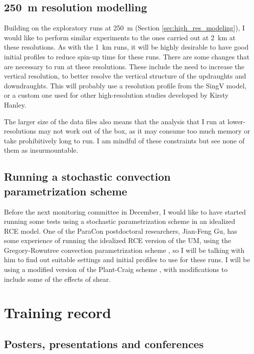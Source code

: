 \documentclass[11pt,a4paper]{article}
\begin{document}
\subsection{\SI{250}{m} resolution modelling}
\label{sec:250m_res}

Building on the exploratory runs at \SI{250}{m} (Section \ref{sec:high_res_modeling}), I would like to perform similar experiments to the ones carried out at \SI{2}{km} at these resolutions. As with the \SI{1}{km} runs, it will be highly desirable to have good initial profiles to reduce spin-up time for these runs. There are some changes that are necessary to run at these resolutions. These include the need to increase the vertical resolution, to better resolve the vertical structure of the updraughts and downdraughts. This will probably use a resolution profile from the SingV model, or a custom one used for other high-resolution studies developed by Kirsty Hanley. 

The larger size of the data files also means that the analysis that I run at lower-resolutions may not work out of the box, as it may consume too much memory or take prohibitively long to run. I am mindful of these constraints but see none of them as insurmountable.
\subsection{Running a stochastic convection parametrization scheme}

Before the next monitoring committee in December, I would like to have started running some tests using a stochastic parametrization scheme in an idealized RCE model. One of the ParaCon postdoctoral researchers, Jian-Feng Gu, has some experience of running the idealized RCE version of the UM, using the Gregory-Rowntree convection parametrization scheme \parencite{gregory1990mass}, so I will be talking with him to find out suitable settings and initial profiles to use for these runs. I will be using a modified version of the Plant-Craig scheme \parencite{plant2008stochastic}, with modifications to include some of the effects of shear.

\section{Training record}
\label{sec:Training record}

\subsection{Posters, presentations and conferences}
\end{document}
